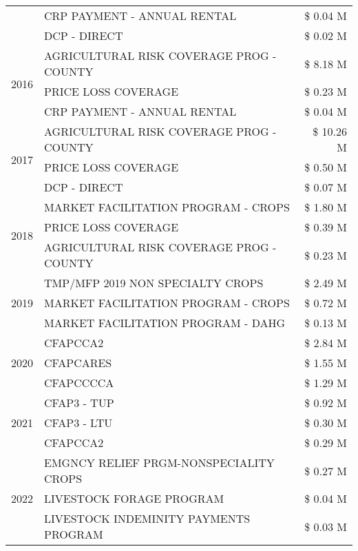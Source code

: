 \begin{tabular}{llr}
 & CRP PAYMENT - ANNUAL RENTAL & \$ 0.04 M \\
 & DCP - DIRECT & \$ 0.02 M \\
\cline{1-3}
\multirow[t]{3}{*}{2016} & AGRICULTURAL RISK COVERAGE PROG - COUNTY & \$ 8.18 M \\
 & PRICE LOSS COVERAGE & \$ 0.23 M \\
 & CRP PAYMENT - ANNUAL RENTAL & \$ 0.04 M \\
\cline{1-3}
\multirow[t]{3}{*}{2017} & AGRICULTURAL RISK COVERAGE PROG - COUNTY & \$ 10.26 M \\
 & PRICE LOSS COVERAGE & \$ 0.50 M \\
 & DCP - DIRECT & \$ 0.07 M \\
\cline{1-3}
\multirow[t]{3}{*}{2018} & MARKET FACILITATION PROGRAM - CROPS & \$ 1.80 M \\
 & PRICE LOSS COVERAGE & \$ 0.39 M \\
 & AGRICULTURAL RISK COVERAGE PROG - COUNTY & \$ 0.23 M \\
\cline{1-3}
\multirow[t]{3}{*}{2019} & TMP/MFP 2019 NON SPECIALTY CROPS & \$ 2.49 M \\
 & MARKET FACILITATION PROGRAM - CROPS & \$ 0.72 M \\
 & MARKET FACILITATION PROGRAM - DAHG & \$ 0.13 M \\
\cline{1-3}
\multirow[t]{3}{*}{2020} & CFAPCCA2 & \$ 2.84 M \\
 & CFAPCARES & \$ 1.55 M \\
 & CFAPCCCCA & \$ 1.29 M \\
\cline{1-3}
\multirow[t]{3}{*}{2021} & CFAP3 - TUP & \$ 0.92 M \\
 & CFAP3 - LTU & \$ 0.30 M \\
 & CFAPCCA2 & \$ 0.29 M \\
\cline{1-3}
\multirow[t]{3}{*}{2022} & EMGNCY RELIEF PRGM-NONSPECIALITY CROPS & \$ 0.27 M \\
 & LIVESTOCK FORAGE PROGRAM & \$ 0.04 M \\
 & LIVESTOCK INDEMINITY PAYMENTS PROGRAM & \$ 0.03 M \\
\cline{1-3}
\bottomrule
\end{tabular}

